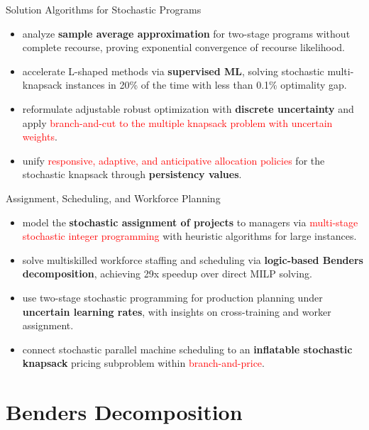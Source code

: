 \documentclass[aspectratio=169,11pt]{beamer}
\begin{document}
\begin{frame}{Solution Algorithms for Stochastic Programs}
	\begin{itemize}
		\item \citet{chen_sample_2022} analyze \textbf{sample average approximation} for two-stage
			programs without complete recourse, proving exponential convergence of
			recourse likelihood.
		\item \citet{larsen_fast_2024} accelerate L-shaped methods via \textbf{supervised ML},
			solving stochastic multi-knapsack instances in 20\% of the time with
			less than 0.1\% optimality gap.
		\item \citet{lefebvre_adjustable_2024} reformulate adjustable robust optimization with
			\textbf{discrete uncertainty} and apply \textcolor{red}{branch-and-cut to the multiple
			knapsack problem with uncertain weights}.
		\item \citet{lyu_stochastic_2022} unify \textcolor{red}{responsive, adaptive, and anticipative allocation
			policies} for the stochastic knapsack through \textbf{persistency values}.
	\end{itemize}
\end{frame}

\begin{frame}{Assignment, Scheduling, and Workforce Planning}
	\begin{itemize}
		\item \citet{rezaeian_assignment_2024} model the \textbf{stochastic assignment of projects} to
			managers via \textcolor{red}{multi-stage stochastic integer programming} with heuristic
			algorithms for large instances.
		\item \citet{nasirian_multiskilled_2025} solve multiskilled workforce staffing and scheduling
			via \textbf{logic-based Benders decomposition}, achieving 29x speedup over
			direct MILP solving.
		\item \citet{cavagnini_workforce_2020} use two-stage stochastic programming for production
			planning under \textbf{uncertain learning rates}, with insights on
			cross-training and worker assignment.
		\item \citet{novak_scheduling_2022} connect stochastic parallel machine scheduling to an
			\textbf{inflatable stochastic knapsack} pricing subproblem within
			\textcolor{red}{branch-and-price}.
	\end{itemize}
\end{frame}

\section{Benders Decomposition}
\end{document}
